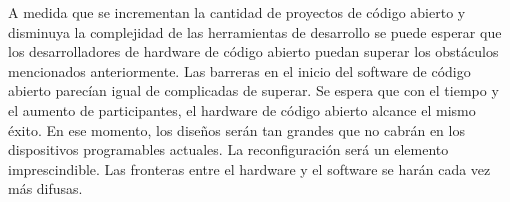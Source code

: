 A medida que se incrementan la cantidad de proyectos de código abierto y disminuya la complejidad de las herramientas de desarrollo se puede esperar que  los desarrolladores de hardware de código abierto puedan superar los obstáculos mencionados anteriormente. Las barreras en el inicio del software de código abierto parecían igual de complicadas de superar. Se espera que con el tiempo y el aumento de participantes, el hardware de código abierto alcance el mismo éxito. En ese momento, los diseños serán tan grandes que no cabrán en los dispositivos programables actuales. La reconfiguración será un elemento imprescindible. Las fronteras entre el hardware y el software se harán cada vez más difusas.


